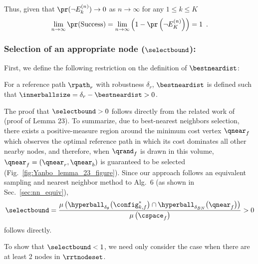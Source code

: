 Thus, given that $\pr(\neg E^{(n)}_k) \rightarrow 0$ as $n \rightarrow \infty$ for any $1 \leq k \leq K$
\begin{equation}
    \lim_{n \rightarrow \infty} \pr(\textrm{Success}) = \lim_{n \rightarrow \infty} \left( 1 - \pr\left( \neg E^{(n)}_K \right) \right) = 1 \enspace.
\end{equation}



\subsubsection{Selection of an appropriate node ($\selectbound$):}
\label{sec:select}

First, we define the following restriction on the definition of $\bestneardist$: 

\begin{definition}
\label{prop:bestnear_requirement}
    For a reference path $\rpath_r$ with robustness $\delta_r$, $\bestneardist$ is defined such that $\innerballsize = \delta_r - \bestneardist > 0$.
\end{definition}


The proof that $\selectbound > 0$ follows directly from the related work of \cite{LiAOKP2016} (proof of Lemma 23).  To summarize, due to best-nearest neighbors selection, there exists a positive-measure region around the minimum cost vertex $\qnear_f$ which observes the optimal reference path in which its cost dominates all other nearby nodes, and therefore, when $\qrand_f$ is drawn in this volume, $\qnear_f = (\qnear_r, \qnear_b)$ is guaranteed to be selected (Fig.~\ref{fig:Yanbo_lemma_23_figure}).  Since our approach follows an equivalent sampling and nearest neighbor method to \cite{LiAOKP2016} Alg.~6 (as shown in Sec.~\ref{sec:nn_equiv}), 
\begin{equation}
    \selectbound = \frac{\mu\left( \hyperball_{\delta_\theta}\big( \config_{k,f}^* \big) \cap \hyperball_{\delta_{BN}}\big( \qnear_f \big) \right)}{\mu\left( \cspace_f \right)} > 0
\end{equation}
follows directly.

To show that $\selectbound < 1$, we need only consider the case when there are at least 2 nodes in $\rrtnodeset$.





